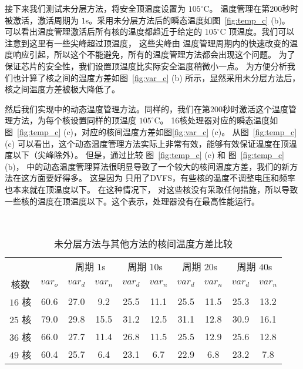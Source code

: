  接下来我们测试未分层方法，将安全顶温度设置为 $105^{\circ}$C。
 温度管理在第200秒时被激活，激活周期为 $1$s。采用未分层方法后的瞬态温度如图~\ref{fig:temp_c} (b)。
 可以看出温度管理激活后所有核的温度都趋近于给定的 $105^{\circ}$C 顶温度。我们可以注意到这里有一些尖峰超过顶温度，
 这些尖峰由 温度管理周期内的快速改变的温度响应引起，所以这个不能避免，所有的温度管理方法都会出现这个问题。
 为了保证芯片的安全性，我们设置顶温度比实际安全温度稍微小一点。
 为方便分析我们也计算了核之间的温度方差如图~\ref{fig:var_c} (b) 所示，显然采用未分层方法后，核之间温度方差被极大降低了。
 
 然后我们实现\cite{Zanini:ECCTD'09}中的动态温度管理方法。同样的，我们在第200秒时激活这个温度管理方法，为每个核设置同样的顶温度 $105^{\circ}$C。
 16核处理器对应的瞬态温度如图~\ref{fig:temp_c} (c)，对应的核间温度方差如图\ref{fig:var_c} (c)。
 从图~\ref{fig:temp_c} (c) 可以看出，这个动态温度管理方法实际上非常有效，能够有效保证温度在顶温度以下（尖峰除外）。
 但是，通过比较 图~\ref{fig:temp_c} (c) 和 图~\ref{fig:temp_c} (b)，
 \cite{Zanini:ECCTD'09}中的动态温度管理算法很明显导致了一个较大的核间温度方差，我们的新方法在这方面要好得多。
 这是因为 \cite{Zanini:ECCTD'09} 只用了DVFS，有些核的温度不调整电压和频率也本来就在顶温度以下。
 在这种情况下，\cite{Zanini:ECCTD'09} 对这些核没有采取任何措施，所以导致一些核的温度在顶温度以下。这个表示，处理器没有在最高性能运行。

  \begin{table*}
 \centering
 \caption{未分层方法与其他方法的核间温度方差比较}~\label{tab:var_c} 
 \begin{tabular}{|c|c|c|c|c|c|c|c|c|c|}
 \hline
 \hline
                &         & \multicolumn{2}{c|}{周期 $1$s} & \multicolumn{2}{c|}{周期 $10$s}& \multicolumn{2}{c|}{周期 $20$s} & \multicolumn{2}{c|}{周期 $40$s}\\
 核数  & $var_o$ & $var_d$ &$var_n$ & $var_d$ &$var_n$  & $var_d$ &$var_n$ & $var_d$ &$var_n$\\
 \hline 
 \hline
 $16$ 核 & 60.6 & 27.0 & 9.2  & 25.5 & 11.1 & 25.5 & 11.5 & 25.3 & 13.2\\
 \hline
 $25$ 核 & 79.0 & 29.8 & 15.5 & 31.2 & 12.5 & 31.1 & 12.8 & 30.9 & 16.1\\
 \hline
 $36$ 核 & 66.0 & 27.7 & 11.4 & 26.8 & 11.5 & 25.5 & 12.9 & 25.6 & 12.8\\
 \hline
 $49$ 核 & 60.4 & 25.7 & 6.4  & 23.1 & 6.7  & 22.9 & 6.8  & 23.2 & 7.8 \\
 \hline
 \hline
 \end{tabular}
 \end{table*}
 
